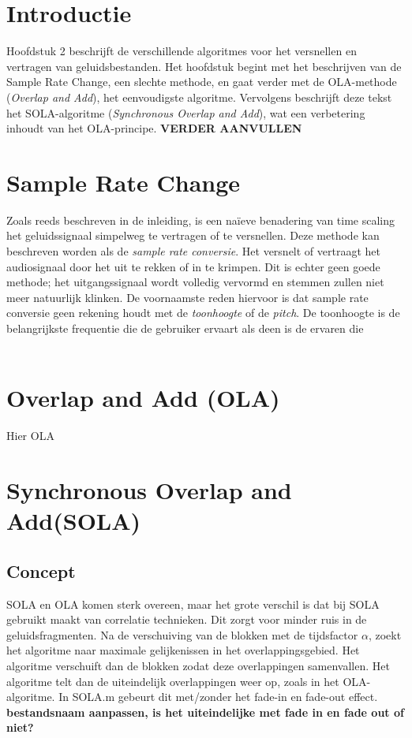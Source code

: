\documentclass[12pt]{report}
\begin{document}
\section{Introductie}
Hoofdstuk 2 beschrijft de verschillende algoritmes voor het versnellen en vertragen van geluidsbestanden. Het hoofdstuk begint met het beschrijven van de Sample Rate Change, een slechte methode, en gaat verder met de OLA-methode (\textit{Overlap and Add}), het eenvoudigste algoritme. Vervolgens beschrijft deze tekst het SOLA-algoritme (\textit{Synchronous Overlap and Add}), wat een verbetering inhoudt van het OLA-principe. 
\textbf{VERDER AANVULLEN}

\section{Sample Rate Change}
Zoals reeds beschreven in de inleiding, is een na\"{i}eve benadering van time scaling het geluidssignaal simpelweg te vertragen of te versnellen. Deze methode kan beschreven worden als de \textit{sample rate conversie}. Het versnelt of vertraagt het audiosignaal door het uit te rekken of in te krimpen. Dit is echter geen goede methode; het uitgangssignaal wordt volledig vervormd en stemmen zullen niet meer natuurlijk klinken. De voornaamste reden hiervoor is dat sample rate conversie geen rekening houdt met de \textit{toonhoogte} of de \textit{pitch}. De toonhoogte is de belangrijkste frequentie die de gebruiker ervaart als deen is de ervaren die    \\
\\

\section{Overlap and Add (OLA)}
Hier OLA

\section{Synchronous Overlap and Add(SOLA)}

\subsection{Concept}
SOLA en OLA komen sterk overeen, maar het grote verschil is dat bij SOLA gebruikt maakt van correlatie technieken. Dit zorgt voor  minder ruis in de geluidsfragmenten. Na de verschuiving van de blokken met de tijdsfactor $\alpha$, zoekt het algoritme naar maximale gelijkenissen in het overlappingsgebied. Het algoritme verschuift dan de blokken zodat deze overlappingen samenvallen. Het algoritme telt dan de uiteindelijk overlappingen weer op, zoals in het OLA-algoritme. In SOLA.m gebeurt dit met/zonder het fade-in en fade-out effect.
\textbf{bestandsnaam aanpassen, is het uiteindelijke met fade in en fade out of niet?}
\end{document}
